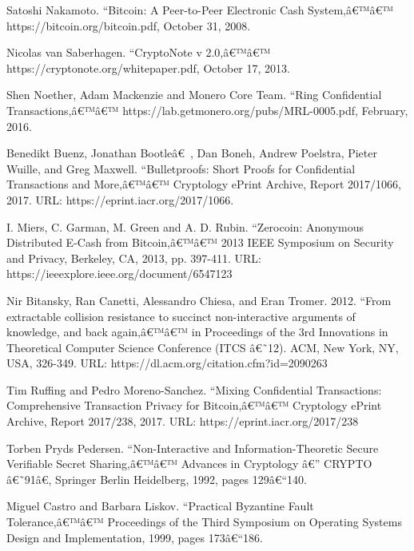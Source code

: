 \documentclass[8pt,fleqn,openany]{book}
\begin{document}
{		
		\newpage
		\raggedright
		
		\begin{thebibliography}{99}
			
			 Satoshi Nakamoto. ``Bitcoin: A Peer-to-Peer Electronic Cash System,â€™â€™ https://bitcoin.org/bitcoin.pdf, October 31, 2008.
			
			 Nicolas van Saberhagen. ``CryptoNote v 2.0,â€™â€™ https://cryptonote.org/whitepaper.pdf, October 17, 2013.
			
			 Shen Noether, Adam Mackenzie and Monero Core Team. ``Ring Confidential Transactions,â€™â€™ https://lab.getmonero.org/pubs/MRL-0005.pdf, February, 2016.
			
			 Benedikt Buenz, Jonathan Bootleâ€ , Dan Boneh, Andrew Poelstra, Pieter Wuille, and Greg Maxwell. ``Bulletproofs: Short Proofs for Confidential Transactions and More,â€™â€™ Cryptology ePrint Archive, Report 2017/1066, 2017. URL: https://eprint.iacr.org/2017/1066.
			
			 I. Miers, C. Garman, M. Green and A. D. Rubin. ``Zerocoin: Anonymous Distributed E-Cash from Bitcoin,â€™â€™ 2013 IEEE Symposium on Security and Privacy, Berkeley, CA, 2013, pp. 397-411. URL: https://ieeexplore.ieee.org/document/6547123
			
			 Nir Bitansky, Ran Canetti, Alessandro Chiesa, and Eran Tromer. 2012. ``From extractable collision resistance to succinct non-interactive arguments of knowledge, and back again,â€™â€™ in Proceedings of the 3rd Innovations in Theoretical Computer Science Conference (ITCS â€˜12). ACM, New York, NY, USA, 326-349. URL: https://dl.acm.org/citation.cfm?id=2090263
			
			 Tim Ruffing and Pedro Moreno-Sanchez. ``Mixing Confidential Transactions: Comprehensive Transaction Privacy for Bitcoin,â€™â€™ Cryptology ePrint Archive, Report 2017/238, 2017. URL: https://eprint.iacr.org/2017/238
			
			 Torben Pryds Pedersen. ``Non-Interactive and Information-Theoretic Secure Verifiable Secret Sharing,â€™â€™ Advances in Cryptology â€” CRYPTO â€˜91â€, Springer Berlin Heidelberg, 1992, pages 129â€“140.
			
			 Miguel Castro and Barbara Liskov. ``Practical Byzantine Fault Tolerance,â€™â€™ Proceedings of the Third Symposium on Operating Systems Design and Implementation, 1999, pages 173â€“186. 
			

\end{thebibliography}}
\end{document}
